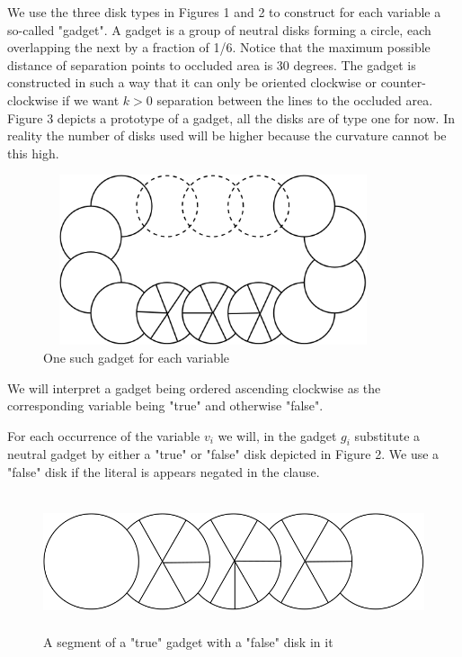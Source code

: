 \documentclass[a4paper,11pt]{article}
\begin{document}
We use the three disk types in Figures 1 and 2 to construct for each variable a so-called "gadget". A gadget is a group of neutral disks forming a circle, each overlapping the next by a fraction of 1/6. Notice that the maximum possible distance of separation points to occluded area is 30 degrees. The gadget is constructed in such a way that it can only be oriented clockwise or counter-clockwise if we want $k>0$ separation between the lines to the occluded area. Figure 3 depicts a prototype of a gadget, all the disks are of type one for now. In reality the number of disks used will be higher because the curvature cannot be this high.

\begin{figure}[h]
\centering
\includegraphics[width=10cm, height=5cm]{assets/np-hardness/gadget.png}
\caption{One such gadget for each variable}
\end{figure}

We will interpret a gadget being ordered ascending clockwise as the corresponding variable being "true" and otherwise "false".

For each occurrence of the variable $v_i$ we will, in the gadget $g_i$ substitute a neutral gadget by either a "true" or "false" disk depicted in Figure 2. We use a "false" disk if the literal is appears negated in the clause.

\begin{figure}[h]
\centering
\includegraphics[width=15cm, height=4cm]{assets/np-hardness/negative.png}
\caption{A segment of a "true" gadget with a "false" disk in it}
\end{figure}
\end{document}
